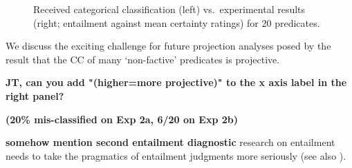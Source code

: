 \documentclass[12pt,fleqn]{article}
\newcommand{\6}{\mbox{$[\hspace*{-.6mm}[$}}
\newcommand{\9}{\mbox{$]\hspace*{-.6mm}]$}}
\begin{document}
\begin{figure}
\caption{Received categorical classification (left) vs.\ experimental results (right; entailment against mean certainty ratings) for 20 predicates.}\label{f-summary-categorical}

\end{figure}

\noindent
We discuss the exciting challenge for future projection analyses posed by the result that the CC of many `non-factive' predicates is projective. 





%
%
%

\newpage

\textbf{JT, can you add "(higher=more projective)" to the x axis label in the right panel?}

{\bf (20\% mis-classified on Exp 2a, 6/20 on Exp 2b)}

{\bf somehow mention second entailment diagnostic} research on entailment needs to take the pragmatics of entailment judgments more seriously (see also \cite{demarneffe-etal2012}). 


\end{document}
